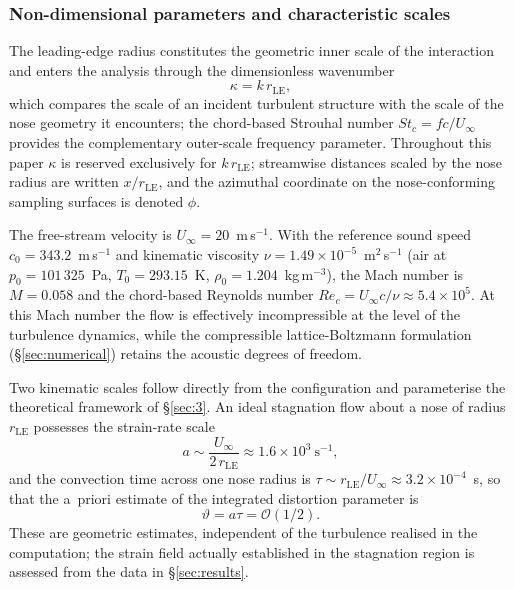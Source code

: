 \documentclass[lineno]{JFM-FLM_Au}
\begin{document}
\subsubsection{Non-dimensional parameters and characteristic scales}

The leading-edge radius constitutes the geometric inner scale of the
interaction and enters the analysis through the dimensionless
wavenumber
\begin{equation}
  \kappa = k\,r_{\mathrm{LE}},
  \label{eq:kappa_def}
\end{equation}
which compares the scale of an incident turbulent structure with the
scale of the nose geometry it encounters; the chord-based Strouhal
number $St_c = fc/U_{\infty}$ provides the complementary outer-scale
frequency parameter. Throughout this paper $\kappa$ is reserved
exclusively for $k\,r_{\mathrm{LE}}$; streamwise distances scaled by
the nose radius are written $x/r_{\mathrm{LE}}$, and the azimuthal
coordinate on the nose-conforming sampling surfaces is denoted
$\phi$.

The free-stream velocity is $U_{\infty} = 20$~m\,s$^{-1}$. With the
reference sound speed $c_0 = 343.2$~m\,s$^{-1}$ and kinematic
viscosity $\nu = 1.49\times10^{-5}$~m$^2$\,s$^{-1}$ (air at
$p_0 = 101\,325$~Pa, $T_0 = 293.15$~K, $\rho_0 = 1.204$~kg\,m$^{-3}$),
the Mach number is $M = 0.058$ and the chord-based Reynolds number
$Re_c = U_{\infty}c/\nu \approx 5.4\times10^{5}$.
At this Mach number the flow is effectively incompressible at the
level of the turbulence dynamics, while the compressible
lattice-Boltzmann formulation (\S\ref{sec:numerical}) retains the
acoustic degrees of freedom.

Two kinematic scales follow directly from the configuration and
parameterise the theoretical framework of \S\ref{sec:3}. An ideal
stagnation flow about a nose of radius $r_{\mathrm{LE}}$ possesses
the strain-rate scale
\begin{equation}
  a \sim \frac{U_{\infty}}{2\,r_{\mathrm{LE}}}
    \approx 1.6\times10^{3}~\mathrm{s}^{-1},
  \label{eq:strain_scale}
\end{equation}
and the convection time across one nose radius is
$\tau \sim r_{\mathrm{LE}}/U_{\infty} \approx 3.2\times10^{-4}$~s, so
that the a~priori estimate of the integrated distortion parameter is
\begin{equation}
  \vartheta = a\tau = \mathcal{O}(1/2).
  \label{eq:vartheta_estimate}
\end{equation}
These are geometric estimates, independent of the turbulence realised
in the computation; the strain field actually established in the
stagnation region is assessed from the data in \S\ref{sec:results}.
\end{document}
